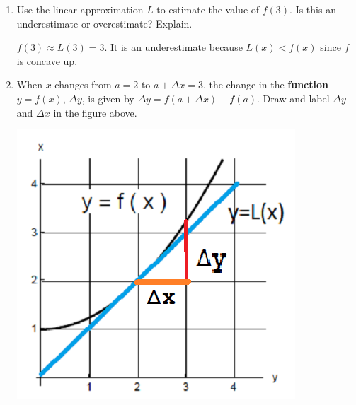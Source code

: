 \documentclass[nooutcomes,handout]{ximera}
\begin{document}
\begin{problem}
\begin{enumerate}
\item Use the linear approximation $L$ to estimate the value of $f(3)$.  Is this an underestimate or overestimate?  Explain.
\begin{freeResponse}
$f(3)\approx L(3)=3$.  It is an underestimate because $L(x)<f(x)$ since $f$ is concave up.
\end{freeResponse}

\item When $x$ changes from $a=2$ to $a+\Delta x=3$, the change in the {\bf function} $y=f(x)$, $\Delta y$, is given by $\Delta y=f(a+ \Delta x)-f(a)$.  Draw and label $\Delta y$ and $\Delta x$ in the figure above.

\begin{freeResponse}
   \begin{image}
      \includegraphics[scale = .6]{figure5.png}
    \end{image}
\end{freeResponse}


\end{enumerate}
\end{problem}
\end{document}
